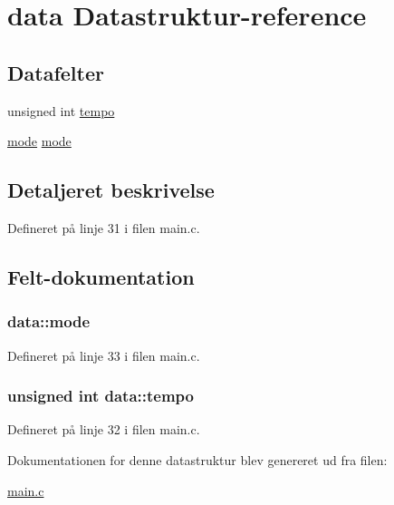 \hypertarget{structdata}{\section{data Datastruktur-\/reference}
\label{structdata}
}
\subsection*{Datafelter}
\begin{DoxyCompactItemize}
\item 
unsigned int \hyperlink{structdata_a31232da79683035a6ff185f530da6c24}{tempo}
\item 
\hyperlink{main_8c_a1a6b6fb557d8d37d59700faf4e4c9167}{mode} \hyperlink{structdata_a9781fc7b786289e4c06b4085d31558e3}{mode}
\end{DoxyCompactItemize}


\subsection{Detaljeret beskrivelse}


Defineret på linje 31 i filen main.\+c.



\subsection{Felt-\/dokumentation}
\hypertarget{structdata_a9781fc7b786289e4c06b4085d31558e3}{
\subsubsection[{mode}]{ data\+::mode}}\label{structdata_a9781fc7b786289e4c06b4085d31558e3}


Defineret på linje 33 i filen main.\+c.

\hypertarget{structdata_a31232da79683035a6ff185f530da6c24}{
\subsubsection[{tempo}]{\setlength{\rightskip}{0pt plus 5cm}unsigned int data\+::tempo}}\label{structdata_a31232da79683035a6ff185f530da6c24}


Defineret på linje 32 i filen main.\+c.



Dokumentationen for denne datastruktur blev genereret ud fra filen\+:\begin{DoxyCompactItemize}
\item 
\hyperlink{main_8c}{main.\+c}\end{DoxyCompactItemize}
